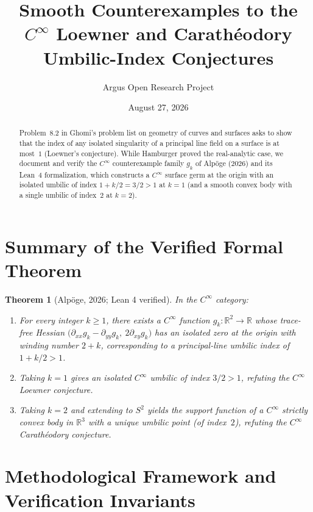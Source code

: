 \documentclass[10pt,reqno]{amsart}
\title[Smooth Surfaces With Isolated Umbilic Index Exceeding One]
{Smooth Counterexamples to the $C^\infty$ Loewner and Carath\'eodory Umbilic-Index Conjectures}
\author{Argus Open Research Project}
\date{August 27, 2026}
\newtheorem{theorem}{Theorem}[section]
\theoremstyle{definition}
\begin{document}
\begin{abstract}
Problem~8.2 in Ghomi's problem list on geometry of curves and surfaces asks to show that the index of any isolated singularity of a principal line field on a surface is at most~$1$ (Loewner's conjecture). While Hamburger proved the real-analytic case, we document and verify the $C^\infty$ counterexample family $g_k$ of Alp\"oge (2026) and its Lean~4 formalization, which constructs a $C^\infty$ surface germ at the origin with an isolated umbilic of index $1+k/2 = 3/2 > 1$ at $k=1$ (and a smooth convex body with a single umbilic of index~$2$ at $k=2$).
\end{abstract}
\maketitle
\section{Summary of the Verified Formal Theorem}
\begin{theorem}[Alp\"oge, 2026; Lean 4 verified]
In the $C^\infty$ category:
\begin{enumerate}[label=\textup{(\arabic*)}]
  \item For every integer $k\ge 1$, there exists a $C^\infty$ function $g_k:\mathbb{R}^2\to\mathbb{R}$ whose trace-free Hessian $\bigl(\partial_{xx}g_k - \partial_{yy}g_k,\ 2\partial_{xy}g_k\bigr)$ has an isolated zero at the origin with winding number $2+k$, corresponding to a principal-line umbilic index of $1 + k/2 > 1$.
  \item Taking $k=1$ gives an isolated $C^\infty$ umbilic of index $3/2 > 1$, refuting the $C^\infty$ Loewner conjecture.
  \item Taking $k=2$ and extending to $S^2$ yields the support function of a $C^\infty$ strictly convex body in $\mathbb{R}^3$ with a unique umbilic point (of index~$2$), refuting the $C^\infty$ Carath\'eodory conjecture.
\end{enumerate}
\end{theorem}

\section{Methodological Framework and Verification Invariants}
\end{document}
